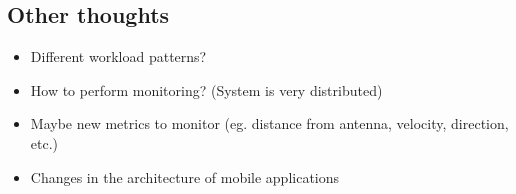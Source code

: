\documentclass[conference]{IEEEtran}
\begin{document}

\subsection{Other thoughts} 

\begin{itemize}
\item Different workload patterns?
\item How to perform monitoring? (System is very distributed)
\item Maybe new metrics to monitor (eg. distance from antenna, velocity, direction, etc.)
\item Changes in the architecture of mobile applications
\end{itemize}





\end{document}
